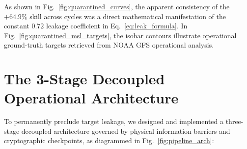\documentclass[10pt,twocolumn,letterpaper]{article}
\begin{document}
As shown in Fig.~\ref{fig:quarantined_curves}, the apparent consistency of the $+64.9\%$ skill across cycles was a direct mathematical manifestation of the constant $0.72$ leakage coefficient in Eq.~\eqref{eq:leak_formula}. In Fig.~\ref{fig:quarantined_msl_targets}, the isobar contours illustrate operational ground-truth targets retrieved from NOAA GFS operational analysis.

\section{The 3-Stage Decoupled Operational Architecture}

To permanently preclude target leakage, we designed and implemented a three-stage decoupled architecture governed by physical information barriers and cryptographic checkpoints, as diagrammed in Fig.~\ref{fig:pipeline_arch}:
\end{document}

